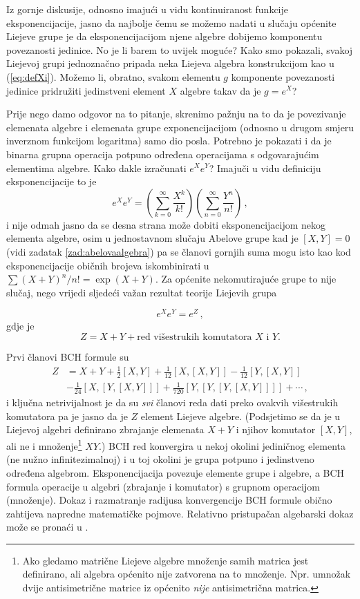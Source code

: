 Iz gornje diskusije, odnosno imajući u vidu kontinuiranost funkcije
eksponencijacije, jasno da najbolje čemu se možemo nadati u
slučaju općenite Liejeve grupe je da
eksponencijacijom njene algebre dobijemo komponentu povezanosti
jedinice. No je li barem to uvijek moguće?
Kako smo pokazali, svakoj Liejevoj grupi jednoznačno pripada neka Liejeva algebra
konstrukcijom kao u (\ref{eq:defXi}). Možemo li, obratno, svakom
elementu $g$  komponente povezanosti jedinice pridružiti jedinstveni
element $X$ algebre takav da je $g = e^{X}$?

Prije nego damo odgovor na to pitanje, skrenimo pažnju na to da je
povezivanje elemenata algebre i elemenata grupe exponencijacijom
(odnosno u drugom smjeru inverznom funkcijom logaritma) samo dio
posla. Potrebno je pokazati i da je binarna grupna operacija potpuno
određena operacijama s odgovarajućim elementima algebre. Kako
dakle izračunati $e^X e^Y$? Imajuči u vidu definiciju eksponencijacije
to je
\begin{equation}
   e^X e^Y = \left(\sum_{k=0}^{\infty} \frac{X^k}{k!}\right)
             \left(\sum_{n=0}^{\infty} \frac{Y^n}{n!}\right)
    \,,
\end{equation}
i nije odmah jasno da se desna strana može dobiti eksponencijacijom nekog
elementa algebre, osim u jednostavnom slučaju Abelove grupe kad je 
$[X, Y]=0$ (vidi zadatak \ref{zad:abelovaalgebra}) pa se članovi
gornjih suma mogu isto kao kod eksponencijacije običnih brojeva
iskombinirati u $\sum (X+Y)^{n}/n! = \exp(X+Y)$. Za općenite
nekomutirajuće grupe to nije slučaj, nego vrijedi sljedeći važan
rezultat teorije Liejevih grupa
\begin{teorem}
    \[ e^X e^Y = e^Z \,, \]
  gdje je 
  \[ Z = X + Y + \text{red višestrukih komutatora $X$ i $Y$.} \]
\end{teorem}
Prvi članovi BCH formule su
\begin{align}
    Z& = X + Y + \frac{1}{2}[X, Y] + \frac{1}{12}[X, [X, Y]] 
       - \frac{1}{12}[Y, [X, Y]] \nonumber \\
     &   - \frac{1}{24}[X, [Y, [X, Y]]] + \frac{1}{720}[Y, [Y, [Y, [X, Y]]]] 
         + \cdots \,,
\end{align}
i ključna netrivijalnost je da su \emph{svi} članovi reda dati preko
ovakvih višestrukih komutatora pa je jasno da je $Z$ element Liejeve algebre.
(Podsjetimo se da je u Liejevoj algebri definirano zbrajanje elemenata $X+Y$ i njihov
 komutator $[X, Y]$, ali ne i množenje\footnote{Ako gledamo matrične
    Liejeve algebre množenje samih matrica jest definirano, ali algebra općenito nije zatvorena
    na to množenje. Npr. umnožak dvije antisimetrične matrice iz  
    općenito \emph{nije} antisimetrična matrica.} $X Y$.)
BCH red konvergira u nekoj okolini jediničnog elementa (ne nužno infinitezimalnoj)
i u toj okolini je grupa potpuno i jedinstveno određena algebrom.
Eksponencijacija povezuje elemente grupe i algebre, a BCH formula
operacije u algebri (zbrajanje i komutator) s grupnom operacijom (množenje).
Dokaz i razmatranje radijusa konvergencije BCH formule
obično zahtijeva napredne matematičke
pojmove. Relativno pristupačan algebarski dokaz može se pronaći
u \cite{Stilwell:2008}.

